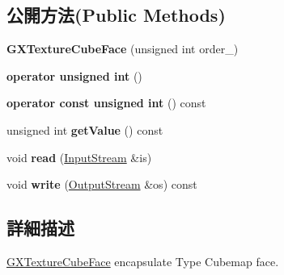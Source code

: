 \subsection*{公開方法(Public Methods)}
\begin{DoxyCompactItemize}
\item 
{\bfseries G\+X\+Texture\+Cube\+Face} (unsigned int order\+\_)\hypertarget{class_i_dream_sky_1_1_g_x_texture_cube_face_a02bed2522822d791e234c267e3e0de17}{}\label{class_i_dream_sky_1_1_g_x_texture_cube_face_a02bed2522822d791e234c267e3e0de17}

\item 
{\bfseries operator unsigned int} ()\hypertarget{class_i_dream_sky_1_1_g_x_texture_cube_face_ae2b883462b6eaf12c2a9047598f28eab}{}\label{class_i_dream_sky_1_1_g_x_texture_cube_face_ae2b883462b6eaf12c2a9047598f28eab}

\item 
{\bfseries operator const unsigned int} () const \hypertarget{class_i_dream_sky_1_1_g_x_texture_cube_face_a3161bba4204104c27d40228880ef0bf7}{}\label{class_i_dream_sky_1_1_g_x_texture_cube_face_a3161bba4204104c27d40228880ef0bf7}

\item 
unsigned int {\bfseries get\+Value} () const \hypertarget{class_i_dream_sky_1_1_g_x_texture_cube_face_a785c79eb28bb17a848ac0816e2d2a2c6}{}\label{class_i_dream_sky_1_1_g_x_texture_cube_face_a785c79eb28bb17a848ac0816e2d2a2c6}

\item 
void {\bfseries read} (\hyperlink{class_i_dream_sky_1_1_input_stream}{Input\+Stream} \&is)\hypertarget{class_i_dream_sky_1_1_g_x_texture_cube_face_ac4198dd3e51c4bb1db464ee0a6a648c5}{}\label{class_i_dream_sky_1_1_g_x_texture_cube_face_ac4198dd3e51c4bb1db464ee0a6a648c5}

\item 
void {\bfseries write} (\hyperlink{class_i_dream_sky_1_1_output_stream}{Output\+Stream} \&os) const \hypertarget{class_i_dream_sky_1_1_g_x_texture_cube_face_afc2bf6d8ed24f72db070770603790f2d}{}\label{class_i_dream_sky_1_1_g_x_texture_cube_face_afc2bf6d8ed24f72db070770603790f2d}

\end{DoxyCompactItemize}


\subsection{詳細描述}
\hyperlink{class_i_dream_sky_1_1_g_x_texture_cube_face}{G\+X\+Texture\+Cube\+Face} encapsulate Type Cubemap face. 

